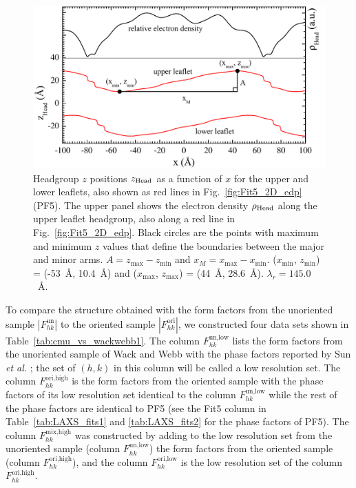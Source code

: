 \begin{figure}[htbp]
  \centering
  \includegraphics[width=\textwidth]{figures/ripple/LAXS/PF5_headgroup}
  \caption[Headgroup $z$ positions $\zhead$ as a function of $x$ for the upper and lower leaflets,
  also shown as red lines in Fig.~\ref{fig:Fit5_2D_edp} (PF5).]
  {Headgroup $z$ positions $\zhead$ as a function of $x$ for the upper and lower leaflets,
  also shown as red lines in Fig.~\ref{fig:Fit5_2D_edp} (PF5).
  The upper panel shows the
  electron density $\rho_\text{Head}$ along the upper leaflet headgroup, also along a 
  red line in Fig.~\ref{fig:Fit5_2D_edp}.
  Black circles are the points with maximum and minimum $z$ values that define the boundaries between 
  the major and minor arms. 
  $A = z_\text{max}-z_\text{min}$ and $x_M = x_\text{max}-x_\text{min}$.
  ($x_\text{min}$, $z_\text{min}$) = (-53~\AA, 10.4~\AA) and 
  ($x_\text{max}$, $z_\text{max}$) = (44~\AA, 28.6~\AA). $\lambda_r=145.0$~\AA.}  
  \label{fig:PF5_headgroup}
\end{figure}

To compare the structure obtained with the form factors from the unoriented sample $|F_{hk}^\text{un}|$ to 
the oriented sample $|F_{hk}^\text{ori}|$,
we constructed four data sets shown in Table~\ref{tab:cmu_vs_wackwebb1}.
The column $F_{hk}^\text{un,low}$ lists the form factors from the unoriented sample
of Wack and Webb \cite{ref:Wack89} with the phase factors 
reported by Sun \textit{et al.} \cite{ref:Sun96};
the set of $(h,k)$ in this column will be called a low resolution set.
The column $F_{hk}^\text{ori,high}$ is the form factors from the oriented sample with the phase factors
of its low resolution set identical to the column $F_{hk}^\text{un,low}$ 
while the rest of the phase factors are identical to PF5 
(see the Fit5 column in Table~\ref{tab:LAXS_fits1} and \ref{tab:LAXS_fits2} for the phase factors of PF5).
The column $F_{hk}^\text{mix,high}$ was constructed by adding to the low resolution set from the 
unoriented sample (column $F_{hk}^\text{un,low}$) the form factors from the oriented sample 
(column $F_{hk}^\text{ori,high}$), 
and the column $F_{hk}^\text{ori,low}$ is the low resolution set of the column $F_{hk}^\text{ori,high}$.

